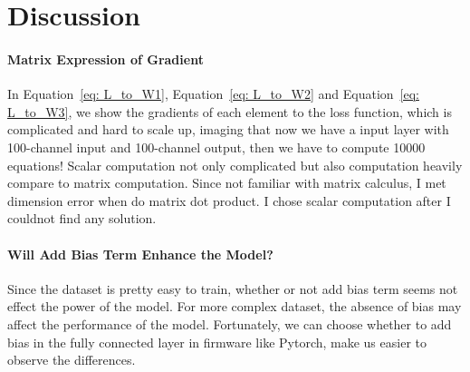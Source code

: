 \documentclass[12pt,a4paper]{article}
\begin{document}
\section{Discussion} \label{sec:discuss}
 
\paragraph{Matrix Expression of Gradient}
In Equation~\ref{eq: L_to_W1}, Equation~\ref{eq: L_to_W2} and Equation~\ref{eq: L_to_W3}, we show the gradients of each element to the loss function, which is complicated and hard to scale up, imaging that now we have a input layer with 100-channel input and 100-channel output, then we have to compute 10000 equations! Scalar computation not only complicated but also computation heavily compare to matrix computation. Since not familiar with matrix calculus, I met dimension error when do matrix dot product. I chose scalar computation after I couldnot find any solution.
\paragraph{Will Add Bias Term Enhance the Model?}
Since the dataset is pretty easy to train, whether or not add bias term seems not effect the power of the model. For more complex dataset, the absence of bias may affect the performance of the model. Fortunately, we can choose whether to add bias in the fully connected layer in firmware like Pytorch, make us easier to observe the differences.
\end{document}

